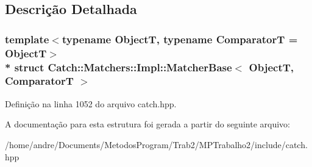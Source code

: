 \subsection{Descrição Detalhada}
\subsubsection*{template$<$typename ObjectT, typename ComparatorT = ObjectT$>$\\*
struct Catch\+::\+Matchers\+::\+Impl\+::\+Matcher\+Base$<$ Object\+T, Comparator\+T $>$}



Definição na linha 1052 do arquivo catch.\+hpp.



A documentação para esta estrutura foi gerada a partir do seguinte arquivo\+:\begin{DoxyCompactItemize}
\item 
/home/andre/\+Documents/\+Metodos\+Program/\+Trab2/\+M\+P\+Trabalho2/include/catch.\+hpp\end{DoxyCompactItemize}
